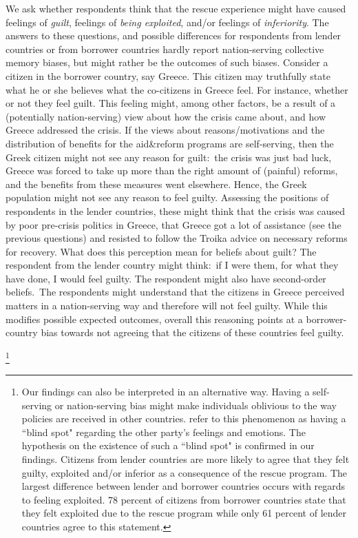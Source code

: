 We ask whether respondents think that the rescue experience might
have caused feelings of \textit{guilt}, feelings of \textit{being
exploited}, and/or feelings of \textit{inferiority}. The answers to these
questions, and possible differences for respondents from lender countries or
from borrower countries hardly report
nation-serving collective memory biases, but might rather be the outcomes of
such biases. Consider a citizen in the borrower country, say Greece. This
citizen may truthfully state what he or she believes what the
co-citizens in Greece feel. For instance, whether or not they feel guilt.
This feeling might, among other factors, be a result of a (potentially
nation-serving) view about how the crisis came about, and how Greece
addressed the crisis. If the views about reasons/motivations and the
distribution of benefits for the aid\&reform programs are self-serving, then
the Greek citizen might not see any reason for guilt:\ the crisis was just
bad luck, Greece was forced to take up more than the right amount of
(painful) reforms, and the benefits from these measures went elsewhere.
Hence, the Greek population might not see any reason to feel guilty.
Assessing the positions of respondents in the lender countries, these might
think that the crisis was caused by poor pre-crisis politics in Greece, that
Greece got a lot of assistance (see the previous questions) and resisted to
follow the Troika advice on necessary reforms for recovery. What does this
perception mean for beliefs about guilt? The respondent from the lender
country might think:\ if I were them, for what they have done, I would feel
guilty. The respondent might also have second-order beliefs.\ The respondents
might understand that the citizens in Greece perceived matters in a
nation-serving way and therefore will not feel guilty. While this modifies
possible expected outcomes, overall this reasoning points at a
borrower-country bias towards not agreeing that the citizens of these
countries feel guilty. 


\footnote{Our findings can also be interpreted in an alternative way.  Having a self-serving or nation-serving bias might make individuals oblivious to
the way policies are received in other countries. 
\cite{dezso} refer to this phenomenon as having a ``blind spot" regarding the other party's 
feelings and emotions. The hypothesis on the existence of such a ``blind spot" is confirmed in our findings.
Citizens from lender countries are more likely to agree that they felt guilty, exploited and/or inferior as a 
consequence of the rescue program. The largest difference between lender and borrower countries occurs with regards to feeling exploited.
78 percent  of citizens from borrower countries state that they felt exploited due to the rescue program while only 61 percent of lender countries
agree to this statement. 
}

